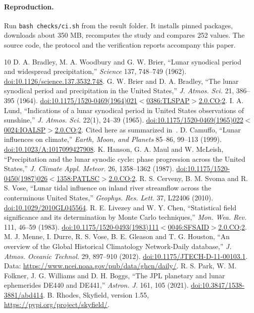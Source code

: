 \documentclass[11pt]{article}
\begin{document}
\paragraph{Reproduction.} Run \texttt{bash checks/ci.sh} from the result folder. It installs pinned packages, downloads about 350 MB, recomputes the study and compares 252 values. The source code, the protocol and the verification reports accompany this paper.

\begin{thebibliography}{10}
 D. A. Bradley, M. A. Woodbury and G. W. Brier, ``Lunar synodical period and widespread precipitation,'' \emph{Science} 137, 748--749 (1962). \href{https://doi.org/10.1126/science.137.3532.748}{doi:10.1126/science.137.3532.748}.
 G. W. Brier and D. A. Bradley, ``The lunar synodical period and precipitation in the United States,'' \emph{J. Atmos. Sci.} 21, 386--395 (1964). \href{https://doi.org/10.1175/1520-0469(1964)021<0386:TLSPAP>2.0.CO;2}{doi:10.1175/1520-0469(1964)021$<$0386:TLSPAP$>$2.0.CO;2}.
 I. A. Lund, ``Indications of a lunar synodical period in United States observations of sunshine,'' \emph{J. Atmos. Sci.} 22(1), 24--39 (1965). \href{https://doi.org/10.1175/1520-0469(1965)022<0024:IOALSP>2.0.CO;2}{doi:10.1175/1520-0469(1965)022$<$0024:IOALSP$>$2.0.CO;2}. Cited here as summarized in~\cite{camuffo2001}.
 D. Camuffo, ``Lunar influences on climate,'' \emph{Earth, Moon, and Planets} 85--86, 99--113 (1999). \href{https://doi.org/10.1023/A:1017099427908}{doi:10.1023/A:1017099427908}.
 K. Hanson, G. A. Maul and W. McLeish, ``Precipitation and the lunar synodic cycle: phase progression across the United States,'' \emph{J. Climate Appl. Meteor.} 26, 1358--1362 (1987). \href{https://doi.org/10.1175/1520-0450(1987)026<1358:PATLSC>2.0.CO;2}{doi:10.1175/1520-0450(1987)026$<$1358:PATLSC$>$2.0.CO;2}.
 R. S. Cerveny, B. M. Svoma and R. S. Vose, ``Lunar tidal influence on inland river streamflow across the conterminous United States,'' \emph{Geophys. Res. Lett.} 37, L22406 (2010). \href{https://doi.org/10.1029/2010GL045564}{doi:10.1029/2010GL045564}.
 R. E. Livezey and W. Y. Chen, ``Statistical field significance and its determination by Monte Carlo techniques,'' \emph{Mon. Wea. Rev.} 111, 46--59 (1983). \href{https://doi.org/10.1175/1520-0493(1983)111<0046:SFSAID>2.0.CO;2}{doi:10.1175/1520-0493(1983)111$<$0046:SFSAID$>$2.0.CO;2}.
 M. J. Menne, I. Durre, R. S. Vose, B. E. Gleason and T. G. Houston, ``An overview of the Global Historical Climatology Network-Daily database,'' \emph{J. Atmos. Oceanic Technol.} 29, 897--910 (2012). \href{https://doi.org/10.1175/JTECH-D-11-00103.1}{doi:10.1175/JTECH-D-11-00103.1}. Data: \url{https://www.ncei.noaa.gov/pub/data/ghcn/daily/}.
 R. S. Park, W. M. Folkner, J. G. Williams and D. H. Boggs, ``The JPL planetary and lunar ephemerides DE440 and DE441,'' \emph{Astron. J.} 161, 105 (2021). \href{https://doi.org/10.3847/1538-3881/abd414}{doi:10.3847/1538-3881/abd414}.
 B. Rhodes, Skyfield, version 1.55, \url{https://pypi.org/project/skyfield/}.
\end{thebibliography}
\end{document}
